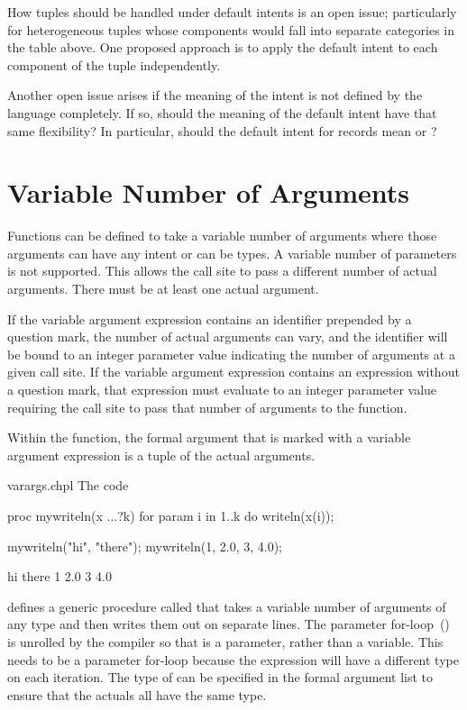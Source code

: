 \begin{openissue}
How tuples should be handled under default intents is an open issue;
particularly for heterogeneous tuples whose components would fall into
separate categories in the table above.  One proposed approach is to
apply the default intent to each component of the tuple independently.

Another open issue arises if the meaning of the  intent is
not defined by the language completely. If so, should the meaning of
the default intent have that same flexibility? In particular, should the
default intent for records mean  or ?
\end{openissue}


\section{Variable Number of Arguments}
\label{Variable_Length_Argument_Lists}

Functions can be defined to take a variable number of arguments where
those arguments can have any intent or can be types.  A variable
number of parameters is not supported.  This allows the call site to
pass a different number of actual arguments.  There must be at least
one actual argument.

If the variable argument expression contains an identifier prepended by a
question mark, the number of actual arguments can vary, and the identifier
will be bound to an integer parameter value indicating the number of
arguments at a given call site.
If the variable argument expression contains an expression without
a question mark, that expression must evaluate to an integer parameter value
requiring the call site to pass that number of arguments to the
function.

Within the function, the formal argument that is marked with a
variable argument expression is a tuple of the actual
arguments.

\begin{chapelexample}{varargs.chpl}
The code
\begin{chapel}
proc mywriteln(x ...?k) {
  for param i in 1..k do
    writeln(x(i));
}
\end{chapel}
\begin{chapelpost}
mywriteln("hi", "there");
mywriteln(1, 2.0, 3, 4.0);
\end{chapelpost}
\begin{chapeloutput}
hi
there
1
2.0
3
4.0
\end{chapeloutput}
defines a generic procedure called  that takes a
variable number of arguments of any type and then writes them out on
separate lines.  The parameter for-loop~()
is unrolled by the compiler so that  is a parameter, rather
than a variable.  This needs to be a parameter for-loop because the
expression  will have a different type on each iteration.
The type of  can be specified in the formal argument list to
ensure that the actuals all have the same type.
\end{chapelexample}

